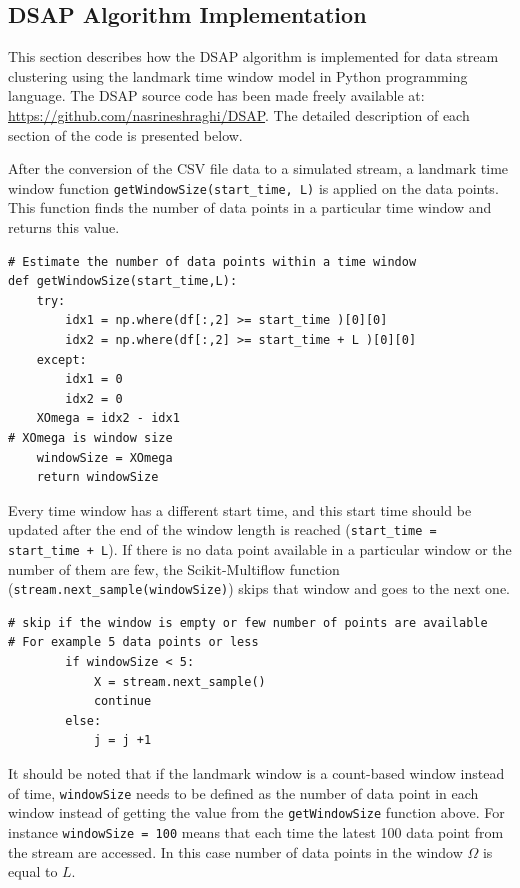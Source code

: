 \subsection{DSAP Algorithm Implementation}
This section describes how the DSAP algorithm is implemented for data stream clustering using the landmark time window model in Python programming language. The DSAP source code has been made freely available at: \url{https://github.com/nasrineshraghi/DSAP}. The detailed description of each section of the code is presented below.

After the conversion of the CSV file data to a simulated stream, a landmark time window function \texttt{getWindowSize(start\_time, L)} is applied on the data points. This function finds the number of data points in a particular time window and returns this value. 

\begin{lstlisting}
# Estimate the number of data points within a time window
def getWindowSize(start_time,L):
    try:
        idx1 = np.where(df[:,2] >= start_time )[0][0]
        idx2 = np.where(df[:,2] >= start_time + L )[0][0] 
    except:
        idx1 = 0
        idx2 = 0
    XOmega = idx2 - idx1
# XOmega is window size
    windowSize = XOmega
    return windowSize
\end{lstlisting}


Every time window has a different start time, and this start time should be updated after the end of the window length is reached (\texttt{start\_time = start\_time + L}). If there is no data point available in a particular window or the number of them are few, the Scikit-Multiflow function (\texttt{stream.next\_sample(windowSize)}) skips that window and goes to the next one.

\begin{lstlisting}
# skip if the window is empty or few number of points are available
# For example 5 data points or less 
        if windowSize < 5:
            X = stream.next_sample()
            continue
        else:    
            j = j +1
\end{lstlisting}


It should be noted that if the landmark window is a count-based window instead of time, \texttt{windowSize} needs to be defined as the number of data point in each window instead of getting the value from the \texttt{getWindowSize} function above. For instance \texttt{windowSize = 100} means that each time the latest 100 data point from the stream are accessed. In this case number of data points in the window $\Omega$ is equal to $L$.

